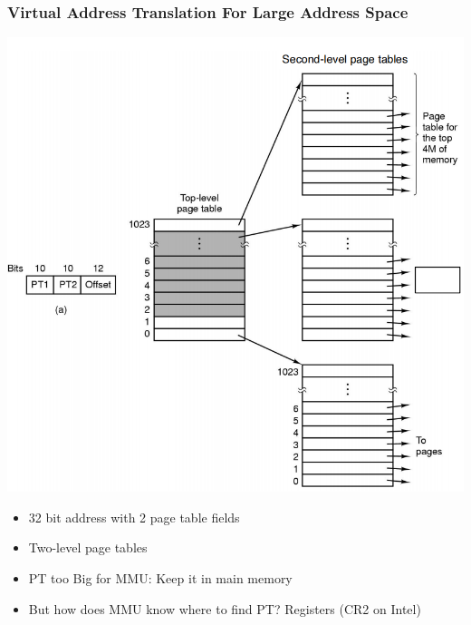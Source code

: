 \documentclass[12pt]{article}
\begin{document}
\subsubsection{Virtual Address Translation For Large Address Space}
\includegraphics[width=\textwidth]{VATranslationExampleBig.png}
\begin{itemize}
    \item 32 bit address with 2 page table fields
    \item Two-level page tables
    \item PT too Big for MMU: Keep it in main memory
    \item But how does MMU know where to find PT? Registers (CR2 on Intel)
\end{itemize}
\end{document}
